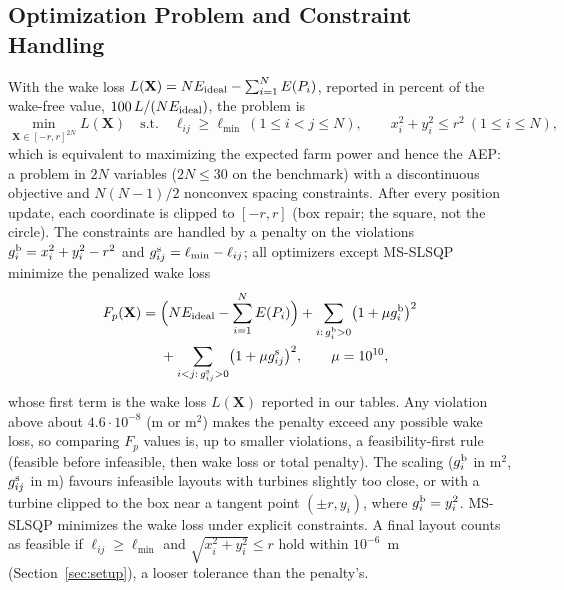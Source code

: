 \subsection{Optimization Problem and Constraint Handling}
\label{sec:constraints}
With the wake loss $L(\mathbf X)=N E_{\rm ideal}-\sum_{i=1}^{N}E(P_i)$, reported in percent of the wake-free value, $100\,L/(NE_{\rm ideal})$, the problem is
\begin{equation}
\min_{\mathbf X\in[-r,r]^{2N}} L(\mathbf X)\quad\text{s.t.}\quad \ell_{ij}\ge\ell_{\min}\ (1\le i<j\le N),\qquad x_i^2+y_i^2\le r^2\ (1\le i\le N),
\label{eq:wflop}
\end{equation}
which is equivalent to maximizing the expected farm power and hence the AEP: a problem in $2N$ variables ($2N\le30$ on the benchmark) with a discontinuous objective and $N(N-1)/2$ nonconvex spacing constraints.
After every position update, each coordinate is clipped to $[-r,r]$ (box repair; the square, not the circle). The constraints are handled by a penalty on the violations $g^{\rm b}_{i}=x_i^2+y_i^2-r^2$ and $g^{\rm s}_{ij}=\ell_{\min}-\ell_{ij}$; all optimizers except MS-SLSQP minimize the penalized wake loss
\begin{equation}
\begin{split}
F_p(\mathbf X)={}&\Bigl(N E_{\rm ideal}-\sum_{i=1}^{N}E(P_i)\Bigr)+\sum_{i:\,g^{\rm b}_i>0}\bigl(1+\mu g^{\rm b}_i\bigr)^2\\
&+\sum_{i<j:\,g^{\rm s}_{ij}>0}\bigl(1+\mu g^{\rm s}_{ij}\bigr)^2,\qquad \mu=10^{10},
\end{split}
\label{eq:penalty}
\end{equation}
whose first term is the wake loss $L(\mathbf X)$ reported in our tables. Any violation above about $4.6\cdot10^{-8}$ (m or m$^2$) makes the penalty exceed any possible wake loss, so comparing $F_p$ values is, up to smaller violations, a feasibility-first rule (feasible before infeasible, then wake loss or total penalty). The scaling ($g^{\rm b}_i$ in m$^2$, $g^{\rm s}_{ij}$ in m) favours infeasible layouts with turbines slightly too close, or with a turbine clipped to the box near a tangent point $(\pm r,y_i)$, where $g^{\rm b}_i=y_i^2$. MS-SLSQP minimizes the wake loss under explicit constraints. A final layout counts as feasible if $\ell_{ij}\ge\ell_{\min}$ and $\sqrt{x_i^2+y_i^2}\le r$ hold within $10^{-6}$~m (Section~\ref{sec:setup}), a looser tolerance than the penalty's.
